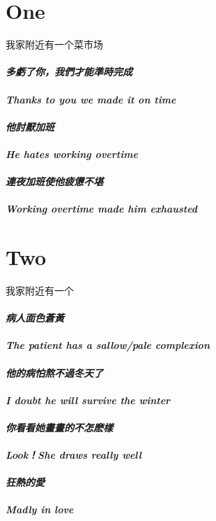 \documentclass[12pt]{book}
\begin{document}
\chapter*{One}


我家附近有一个菜市场
\paragraph{多虧了你，我們才能準時完成\\\\Thanks to you we made it on time\\\\他討厭加班\\\\He hates working overtime\\\\連夜加班使他疲憊不堪\\\\Working overtime made him exhausted}

\chapter*{Two}
我家附近有一个
\paragraph{病人面色蒼黃\\\\The patient has a sallow/pale complexion\\\\他的病怕熬不過冬天了\\\\I doubt he will survive the winter\\\\
你看看她畫畫的不怎麽樣\\\\Look！She draws really well\\\\狂熱的愛\\\\Madly in love}

\paragraph{}
\end{document}
